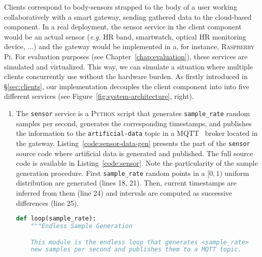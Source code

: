 Clients correspond to body-sensors strapped to the body of a user working collaboratively with a smart gateway, sending gathered data to the cloud-based component. 
In a real deployment, the sensor service in the client component would be an actual sensor (\textit{e.g.} HR band, smartwatch, optical HR monitoring device, ...) and the gateway would be implemented in a, for instance, \textsc{Raspberry Pi}.
For evaluation purposes (see Chapter~\ref{chap:evaluation}), these services are simulated and virtualized.
This way, we can simulate a situation where multiple clients concurrently use \projName without the hardware burden.
As firstly introduced in \S\ref{sec:clients}, our implementation decouples the client component into into five different services (see Figure~\ref{fig:system-architecture}, right). 
\begin{enumerate}
    \item The \texttt{sensor} service is a \textsc{Python} script that generates \texttt{sample\_rate} random samples per second, generates the corresponding timestamps, and publishes the information to the \texttt{artificial-data} topic in a \textsc{MQTT}~\cite{mqtt-protocol} broker located in the gateway. Listing~\ref{code:sensor-data-gen} presents the part of the \texttt{sensor} source code where artificial data is generated and published. The full source code is available in Listing~\ref{code:sensor}. Note the particularity of the sample generation procedure. First \texttt{sample\_rate} random points in a $[0, 1)$ uniform distribution are generated (lines 18, 21). Then, current timestamps are inferred from them (line 24) and intervals are computed as successive differences (line 25).
\begin{lstlisting}[language=Python,caption={Snippet illustrating the artificial data generation in the \texttt{sensor} service.},label=code:sensor-data-gen]
def loop(sample_rate):
    """Endless Sample Generation

    This module is the endless loop that generates <sample_rate>
    new samples per second and publishes them to a MQTT topic.


\end{lstlisting}
\end{enumerate}
